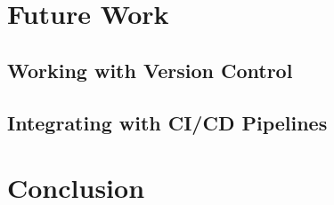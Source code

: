 \documentclass[12pt,twocolumn,letterpaper]{article}
\begin{document}
\cite{Zou21}

\section{Future Work}
\label{sec:future-work}

\subsection{Working with Version Control}
\label{sub:working-with-version-control}

\subsection{Integrating with CI/CD Pipelines}
\label{sub:integrating-with-cicd-pipelines}

\section{Conclusion}
\label{sec:conclusion}

{\small


}
\end{document}
